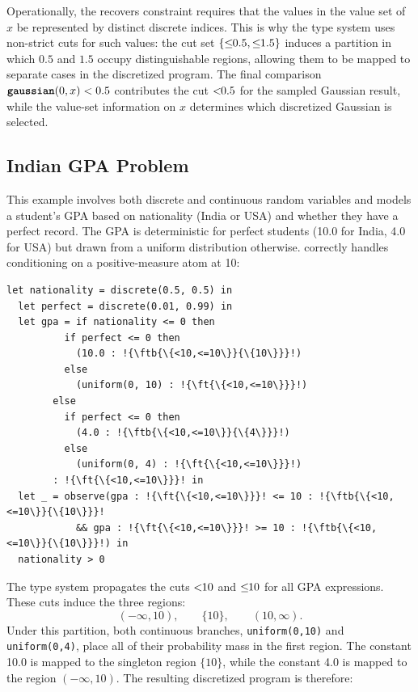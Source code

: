 Operationally, the recovers constraint requires that the values in the value set of $x$ be represented by distinct discrete indices. This is why the type system uses non-strict cuts for such values: the cut set $\{\leq\!\!{0.5},\leq\!\!{1.5}\}$ induces a partition in which $0.5$ and $1.5$ occupy distinguishable regions, allowing them to be mapped to separate cases in the discretized program. The final comparison $\textnormal{\ttfamily\bfseries gaussian}(0,x) < 0.5$ contributes the cut $<\!\!{0.5}$ for the sampled Gaussian result, while the value-set information on $x$ determines which discretized Gaussian is selected.

\subsection{Indian GPA Problem}\label{ap:gpa}

This example involves both discrete and continuous random variables and models a student's GPA based on nationality (India or USA) and whether they have a perfect record. The GPA is deterministic for perfect students (10.0 for India, 4.0 for USA) but drawn from a uniform distribution otherwise. \Slice{} correctly handles conditioning on a positive-measure atom at 10:


\begin{lstlisting}[aboveskip=1em,belowskip=1em,escapechar=!]
  let nationality = discrete(0.5, 0.5) in
  let perfect = discrete(0.01, 0.99) in
  let gpa = if nationality <= 0 then
          if perfect <= 0 then
            (10.0 : !{\ftb{\{<10,<=10\}}{\{10\}}}!)
          else
            (uniform(0, 10) : !{\ft{\{<10,<=10\}}}!)
        else
          if perfect <= 0 then
            (4.0 : !{\ftb{\{<10,<=10\}}{\{4\}}}!)
          else
            (uniform(0, 4) : !{\ft{\{<10,<=10\}}}!)
        : !{\ft{\{<10,<=10\}}}! in
  let _ = observe(gpa : !{\ft{\{<10,<=10\}}}! <= 10 : !{\ftb{\{<10,<=10\}}{\{10\}}}!
            && gpa : !{\ft{\{<10,<=10\}}}! >= 10 : !{\ftb{\{<10,<=10\}}{\{10\}}}!) in 
  nationality > 0
\end{lstlisting}

\noindent
The type system propagates the cuts $<\!\!{10}$ and $\leq\!\!{10}$ for all GPA expressions. These cuts induce the three regions:
\[
(-\infty,10), \qquad \{10\}, \qquad (10,\infty).
\]
Under this partition, both continuous branches, \texttt{uniform(0,10)} and \texttt{uniform(0,4)}, place all of their probability mass in the first region. The constant 10.0 is mapped to the singleton region $\{10\}$, while the constant 4.0 is mapped to the region $(-\infty,10)$. The resulting discretized program is therefore:


